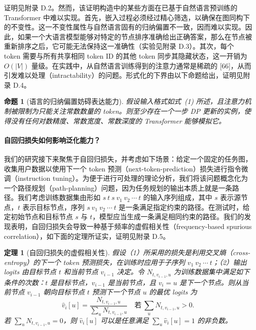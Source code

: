 \documentclass[11pt,UTF8,fontset=fandol]{ctexart}
\newtheorem{theorem}{定理}
\newtheorem{proposition}{命题}
\begin{document}
证明见附录 D.2。然而，该证明构造中的某些方面在已基于自然语言预训练的 Transformer 中难以实现。首先，嵌入过程必须经过精心筛选，以确保在图同构下的不变性。这一不变性属性与自然语言固有的归纳偏置不一致，因而难以实现。因此，如果一个大语言模型能够对特定的节点排序准确给出正确答案，那么在节点被重新排序之后，它可能无法保持这一准确性（实验见附录 D.3）。其次，每个 token 需要与所有共享相同 token ID 的其他 token 同步其隐藏状态，这一开销为 $O(|V|)$ 量级。在实践中，从自然语言训练得到的注意力通常是稀疏的 [66]，从而引发难以处理（intractability）的问题。形式化的下界由以下命题给出，证明见附录 D.4。

\begin{proposition}[语言的归纳偏置妨碍表达能力]
假设输入格式如式~(1) 所述，且注意力机制被限制为只能关注常数数量的 token。则至少存在一个一步 DP 更新的实例，使得没有任何对数精度、常数宽度、常数深度的 Transformer 能够模拟它。
\end{proposition}

\paragraph{自回归损失如何影响泛化能力？}
我们的研究接下来聚焦于自回归损失，并考虑如下场景：给定一个固定的任务图，收集用户数据以使用下一个 token 预测（next-token-prediction）损失进行指令微调（instruction tuning）。为便于进行可处理的理论分析，我们将该问题概念化为一个路径规划（path-planning）问题，因为任务规划的输出本质上就是一条路径。我们考虑训练数据集由形如 $s\ t\ s\ v_1\ v_2\ \cdots\ t$ 的输入序列组成，其中 $s$ 表示源节点，$t$ 表示目标节点，序列 $s\ v_1\ v_2\ \cdots\ t$ 是一条满足指定约束的路径。在测试时，给定初始节点和目标节点 $s$ 与 $t$，模型应当生成一条满足相同约束的路径。我们的发现表明，自回归损失会导致一种基于频率的虚假相关性（frequency-based spurious correlation），如下面的定理所证实，证明见附录 D.5。

\begin{theorem}[自回归损失的虚假相关性]
假设（1）所采用的损失是利用交叉熵（cross-entropy）的下一个 token 预测损失，在训练时应用于子序列 $v_1\ v_2\ \cdots\ t$；（2）输出 logits 由目标节点 $t$ 和当前节点 $v_{i-1}$ 决定。令 $N_{t,v_{i-1},u}$ 为训练数据集中满足如下条件的次数：$t$ 是目标节点，$v_{i-1}$ 是当前节点，且 $v_i = u$ 是下一个节点。则从当前节点 $v_{i-1}$ 朝向目标节点 $t$ 预测下一个节点 $u$ 的最优 logits 为
\[
\hat{v}_i[u] = \frac{N_{t,v_{i-1},u}}{\sum_u N_{t,v_{i-1},u}}\quad \text{若}\ \sum_u N_{t,v_{i-1},u} > 0.
\]
若 $\sum_u N_{t,v_{i-1},u} = 0$，则 $\hat{v}_i[u]$ 可以是任意满足 $\sum_u \hat{v}_i[u] = 1$ 的非负数。
\end{theorem}
\end{document}
